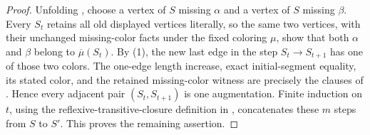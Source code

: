\begin{proof}
Unfolding , choose a vertex of \(S\) missing
\(\alpha\) and a vertex of \(S\) missing \(\beta\).  Every \(S_t\)
retains all old displayed vertices literally, so the same two vertices,
with their unchanged missing-color facts under the fixed coloring \(\mu\),
show that both \(\alpha\) and \(\beta\) belong to
\(\overline\mu(S_t)\).  By (1), the new last edge in the step
\(S_t\to S_{t+1}\) has one of those two colors.  The one-edge length
increase, exact initial-segment equality, its stated color, and the retained
missing-color witness are precisely the clauses of
.  Hence every adjacent pair
\((S_t,S_{t+1})\) is one augmentation.  Finite induction on \(t\), using
the reflexive-transitive-closure definition in
, concatenates these \(m\) steps
from \(S\) to \(S'\).  This proves the remaining assertion.
\end{proof}
